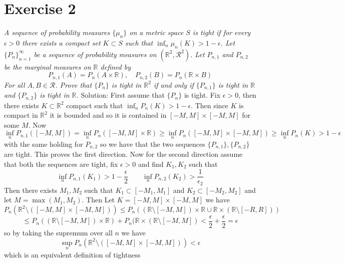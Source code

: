 \documentclass[11pt]{article}
\newcommand{\solution}[1]{{{\textcolor{header}{Solution:} \textcolor{solution}{#1}}}}
\begin{document}
\section{Exercise 2}
\emph{
    A sequence of probability measures $\{\mu_n\}$ on a metric space $S$ is tight if for every  $\epsilon >0$
    there exists a compact set $K \subset S$ such that $\inf_n \mu_n(K) > 1 - \epsilon$.
    Let $\{P_n\}_{n=1}^{\infty}$ be a sequence of probability measures on $ (\mathbb{R}^2, \mathcal{R}^2)$. Let $ P_{n,1}$ and  $P_{n,2}$ be the marginal measures on  $ \mathbb{R}$ defined by
    \[
        P_{n,1}(A) = P_n(A \times \mathbb{R}), \quad P_{n,2}(B) = P_n( \mathbb{R} \times B)
    \] 
    For all $A,B \in \mathcal{R}$. Prove that  $\{P_n\}$ is tight in  $ \mathbb{R}^2$ if and only if $\{P_{n,1}\}$ is tight in $ \mathbb{R}$ and $\{P_{n,2}\}$ is tight in  $ \mathbb{R}$.
}
\solution{
    First assume that $\{P_n\}$ is tight. Fix  $\epsilon > 0$, then there exists $K \subset  \mathbb{R}^2$ compact such that $\inf_{n} P_n(K) > 1 - \epsilon$. Then
    since $K$ is compact in $ \mathbb{R}^2$ it is bounded and so it is contained in $[-M,M] \times [-M,M]$ for some  $M$.
    Now
    \[
        \inf_n P_{n,1}([-M,M]) = \inf_n P_n([-M,M] \times \mathbb{R}) \ge \inf_n P_n([-M,M] \times [-M,M]) \ge \inf_n P_n(K) > 1-\epsilon
    \] 
    with the same holding for $P_{n,2}$ so we have that the two sequences  $\{P_{n,1}\}, \{P_{n,2}\}$ are tight.
    This proves the first direction. Now for the second direction assume that both the sequences are tight, fix  $\epsilon > 0$ and find $K_1,K_2$ such that
    \[
        \inf_n P_{n,1}(K_1) > 1 - \frac{\epsilon}{2}  \qquad \inf_n P_{n,2}(K_2) > \frac{1}{\epsilon_2}
    \] 
    Then there exists $M_1,M_2$ such that $K_1 \subset [-M_1,M_1]$ and $K_2 \subset [-M_2,M_2]$ and let $M = \max(M_1,M_2)$. 
    Then Let $K = [-M,M] \times [-M,M]$ we have
     \[
         P_n( \mathbb{R}^2 \setminus ([-M,M] \times [-M,M])) \le P_n(( \mathbb{R} \setminus [-M,M]) \times \mathbb{R} \cup \mathbb{R} \times ( \mathbb{R} \setminus [-R,R])) 
    \] 
    \[
        \le P_n( ( \mathbb{R} \setminus [-M,M]) \times \mathbb{R}) + P_n( \mathbb{R} \times ( \mathbb{R} \setminus [-M,M]) < \frac{\epsilon}{2} + \frac{\epsilon}{2} = \epsilon
    \] 
    so by taking the supremum over all $n$ we have
    \[
        \sup_n P_n( \mathbb{R}^2 \setminus([-M,M] \times [-M,M])) < \epsilon
    \] 
    which is an equivalent definition of tightness
}
\end{document}
